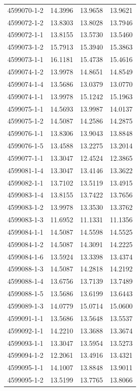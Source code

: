 \begin{longtable}{lrrr}
4599070-1-2 & 14.3996 & 13.9658 & 13.9621 \\
4599072-1-2 & 13.8303 & 13.8028 & 13.7946 \\
4599072-1-1 & 13.8155 & 13.5730 & 13.5460 \\
4599073-1-2 & 15.7913 & 15.3940 & 15.3863 \\
4599073-1-1 & 16.1181 & 15.4738 & 15.4616 \\
4599074-1-2 & 13.9978 & 14.8651 & 14.8549 \\
4599074-1-4 & 13.5686 & 13.0379 & 13.0770 \\
4599074-1-1 & 13.9978 & 15.1242 & 15.1963 \\
4599075-1-1 & 14.5693 & 13.9987 & 14.0137 \\
4599075-1-2 & 14.5087 & 14.2586 & 14.2875 \\
4599076-1-1 & 13.8306 & 13.9043 & 13.8848 \\
4599076-1-5 & 13.4588 & 13.2275 & 13.2014 \\
4599077-1-1 & 13.3047 & 12.4524 & 12.3865 \\
4599081-1-4 & 13.3047 & 13.4146 & 13.3622 \\
4599082-1-1 & 13.7102 & 13.5119 & 13.4915 \\
4599083-1-4 & 13.8155 & 13.7422 & 13.7656 \\
4599083-1-2 & 13.9978 & 13.3530 & 13.3762 \\
4599083-1-3 & 11.6952 & 11.1331 & 11.1356 \\
4599084-1-1 & 14.5087 & 14.5598 & 14.5525 \\
4599084-1-2 & 14.5087 & 14.3091 & 14.2225 \\
4599084-1-6 & 13.5924 & 13.3398 & 13.4374 \\
4599088-1-3 & 14.5087 & 14.2818 & 14.2192 \\
4599088-1-4 & 13.6756 & 13.7139 & 13.7489 \\
4599088-1-5 & 13.5686 & 13.6199 & 13.6443 \\
4599089-1-3 & 14.0779 & 15.0714 & 15.0600 \\
4599091-1-1 & 13.5686 & 13.5648 & 13.5537 \\
4599092-1-1 & 14.2210 & 13.3688 & 13.3674 \\
4599093-1-1 & 13.3047 & 13.5954 & 13.5273 \\
4599094-1-2 & 12.2061 & 13.4916 & 13.4321 \\
4599095-1-1 & 14.1007 & 13.8848 & 13.9011 \\
4599095-1-2 & 13.5199 & 13.7765 & 13.8066 \\

\end{longtable}
